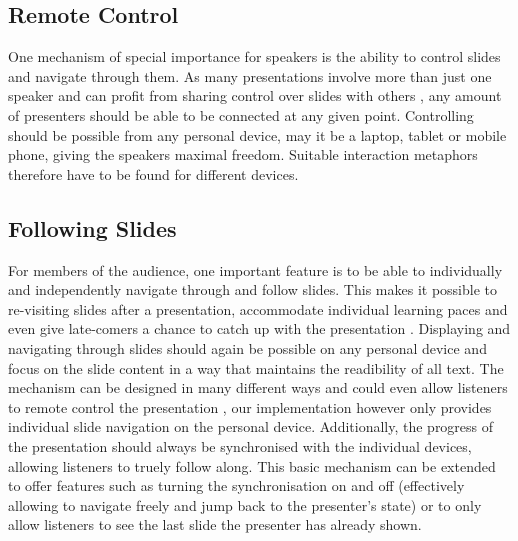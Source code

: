 %

\subsection{Remote Control}
One mechanism of special importance for speakers is the ability to control slides and navigate through them. As many presentations involve more than just one speaker and can profit from sharing control over slides with others \cite{Chattopadhyay:OfficeSocialRemoteControl}, any amount of presenters should be able to be connected at any given point. Controlling should be possible from any personal device, may it be a laptop, tablet or mobile phone, giving the speakers maximal freedom. Suitable interaction metaphors therefore have to be found for different devices.

\subsection{Following Slides}
For members of the audience, one important feature is to be able to individually and independently navigate through and follow slides. This makes it possible to re-visiting slides after a presentation, accommodate individual learning paces \cite{Cheng:TreebasedOnlinePresentations} and even give late-comers a chance to catch up with the presentation \cite{Chattopadhyay:OfficeSocialRemoteControl}. Displaying and navigating through slides should again be possible on any personal device and focus on the slide content in a way that maintains the readibility of all text. The mechanism can be designed in many different ways and could even allow listeners to remote control the presentation \cite{Chattopadhyay:OfficeSocialRemoteControl}, our implementation however only provides individual slide navigation on the personal device. Additionally, the progress of the presentation should always be synchronised with the individual devices, allowing listeners to truely follow along. This basic mechanism can be extended to offer features such as turning the synchronisation on and off (effectively allowing to navigate freely and jump back to the presenter's state) or to only allow listeners to see the last slide the presenter has already shown.


